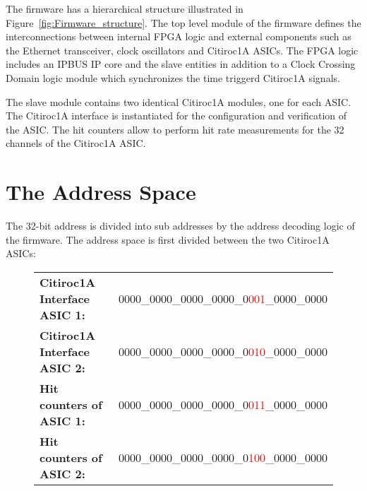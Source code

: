 The firmware has a hierarchical structure illustrated in Figure~\ref{fig:Firmware_structure}. 
\newline
The top level module of the firmware defines the interconnections between internal FPGA logic and external components such as the Ethernet transceiver, clock oscillators and Citiroc1A ASICs.
\newline
The FPGA logic includes an IPBUS IP core and the slave entities in addition to a Clock Crossing Domain logic module which synchronizes the time triggerd Citiroc1A signals. 
\newline

The slave module contains two identical Citiroc1A modules, one for each ASIC. The Citiroc1A interface is instantiated for the configuration and verification of the ASIC.
The hit counters allow to perform hit rate measurements for the 32 channels of the Citiroc1A ASIC. 
\section{The Address Space}
The 32-bit address is divided into sub addresses by the address decoding logic of the firmware.
\newline
The address space is first divided between the two Citiroc1A ASICs:
\begin{figure}[H]
    \centering
\begin{tabular}{p{7cm} l}
    \textbf{Citiroc1A Interface ASIC 1:} & 0000\_0000\_0000\_0000\_0\textcolor{red}{001}\_0000\_0000 \\
    \textbf{Citiroc1A Interface ASIC 2:} & 0000\_0000\_0000\_0000\_0\textcolor{red}{010}\_0000\_0000 \\
    \textbf{Hit counters of ASIC 1:} & 0000\_0000\_0000\_0000\_0\textcolor{red}{011}\_0000\_0000 \\
    \textbf{Hit counters of ASIC 2: } & 0000\_0000\_0000\_0000\_0\textcolor{red}{100}\_0000\_0000\\
\end{tabular}
\end{figure}

